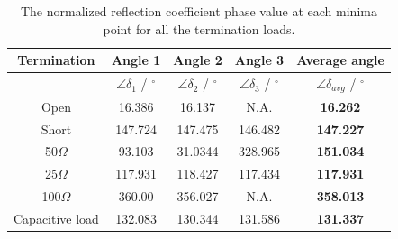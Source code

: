 \begin{table}[ht!]
	\centering
	\begin{tabular}{|c|c|c|c|c|}
		\hline
		\textbf{Termination} & \textbf{Angle 1} & \textbf{Angle 2} & \textbf{Angle 3} & \textbf{Average angle} \\
		\hline
		& $\angle \delta_1$ / $^\circ$ & $\angle \delta_2$ / $^\circ$ & $\angle \delta_3$ / $^\circ$ & $\angle \delta_{avg}$ / $^\circ$ \\
		\hline\hline
		Open            & 16.386  & 16.137	 & N.A. & \textbf{16.262} \\
		Short           & 147.724 & 147.475  & 146.482 & \textbf{147.227} \\
		50$\Omega$      & 93.103  & 31.0344  & 328.965 & \textbf{151.034} \\
		25$\Omega$      & 117.931 & 118.427  & 117.434 & \textbf{117.931} \\
		100$\Omega$     & 360.00  & 356.027  & N.A. & \textbf{358.013} \\
		Capacitive load & 132.083 & 130.344  & 131.586 & \textbf{131.337} \\
		\hline
	\end{tabular}
	\caption{\centering The normalized reflection coefficient phase value at each minima point for all the termination loads.}
	\label{tab:refl_phase_values_norm}
\end{table}